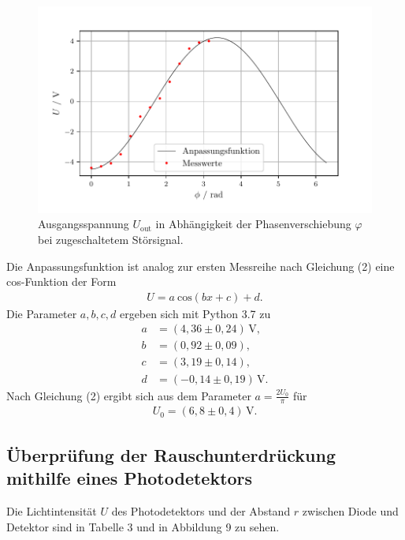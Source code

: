 \begin{figure}[H]
  \centering
  \includegraphics{plot2.pdf}
  \caption{Ausgangsspannung $U_\text{out}$ in Abhängigkeit der Phasenverschiebung $\varphi$
  bei zugeschaltetem Störsignal.}
\end{figure}

Die Anpassungsfunktion ist analog zur ersten Messreihe nach Gleichung (2) eine cos-Funktion der Form
\begin{align*}
U = a\:\text{cos} (bx + c) + d.
\end{align*}
Die Parameter $a,b,c,d$ ergeben sich mit Python 3.7 zu
\begin{align*}
a &= (4,36 \pm 0,24)\,\si{\volt}, \\
b &= (0,92 \pm 0,09), \\
c &= (3,19 \pm 0,14), \\
d &= (-0,14 \pm 0,19)\,\si{\volt}.
\end{align*}
Nach Gleichung (2) ergibt sich aus dem Parameter $a = \frac{2 U_\text{0}}{\pi}$ für
\begin{align*} 
U_\text{0} = (6,8 \pm 0,4)\,\si{\volt}.
\end{align*}

\subsection{Überprüfung der Rauschunterdrückung mithilfe eines Photodetektors}
Die Lichtintensität $U$ des Photodetektors und der Abstand $r$ zwischen Diode und Detektor
sind in Tabelle 3 und in Abbildung 9 zu sehen.

